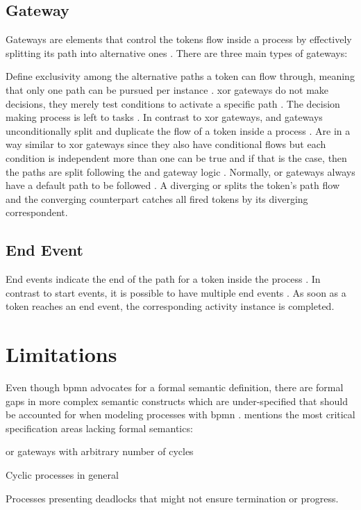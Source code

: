 \subsection{Gateway}

Gateways are elements that control the tokens flow inside a process by effectively splitting its path into alternative ones \citep{Silver2011}. There are three main types of gateways:

\begin{enumerate}
	 Define exclusivity among the alternative paths a token can flow through, meaning that only one path can be pursued per instance \citep{Silver2011}. \gls{xor} gateways do not make decisions, they merely test conditions to activate a specific path \citep{Silver2011}. The decision making process is left to tasks \citep{Silver2011}.
	 In contrast to \gls{xor} gateways, \gls{and} gateways unconditionally split and duplicate the flow of a token inside a process \citep{Silver2011}.
	 Are in a way similar to \gls{xor} gateways since they also have conditional flows but each condition is independent \ie more than one can be true and if that is the case, then the paths are split following the \gls{and} gateway logic \citep{Silver2011}. Normally, \gls{or} gateways always have a default path to be followed \citep{Silver2011}. A diverging \gls{or} splits the token's path flow and the converging counterpart catches all fired tokens by its diverging correspondent.
\end{enumerate}

\subsection{End Event}

End events indicate the end of the path for a token inside the process \citep{Silver2011}. In contrast to start events, it is possible to have multiple end events \citep{Silver2011}. As soon as a token reaches an end event, the corresponding activity instance is completed.

\section{ Limitations}

Even though \gls{bpmn} advocates for a formal semantic definition, there are formal gaps in more complex semantic constructs which are under-specified that should be accounted for when modeling processes with \gls{bpmn} \citep{Soerensen2005}. \citet{Soerensen2005} mentions the most critical specification areas lacking formal semantics:
\begin{enumerate*}
	\item \gls{or} gateways with arbitrary number of cycles
	\item Cyclic processes in general
	\item Processes presenting deadlocks that might not ensure termination or progress.
\end{enumerate*}


